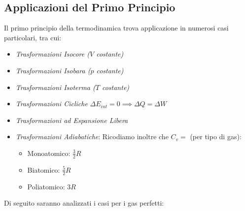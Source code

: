         \subsection*{Applicazioni del Primo Principio} Il primo principio della 
        termodinamica trova applicazione in numerosi casi particolari, tra cui:
            \begin{itemize}
                \item \textit{Trasformazioni Isocore ($V$ costante)}
                \item \textit{Trasformazioni Isobara ($p$ costante)}
                \item \textit{Trasformazioni Isoterma ($T$ costante)}
                \item \textit{Trasformazioni Cicliche}
                    $\Delta E_{int} = 0 \implies \Delta Q = \Delta W$
                \item \textit{Trasformazioni ad Espansione Libera}
                \item \textit{Trasformazioni Adiabatiche}: Ricodiamo 
                        inoltre che $C_v = $ (per tipo di gas):
                        \begin{itemize}
                            \item Monoatomico: $\frac{3}{2} R$
                            \item Biatomico: $\frac{5}{2} R$
                            \item Poliatomico: $3 R$
                        \end{itemize}
            \end{itemize}

            Di seguito saranno analizzati i casi per i gas perfetti:
            
